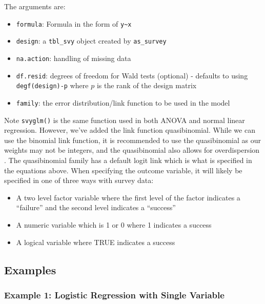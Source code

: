 \documentclass[
]{krantz}
\providecommand{\tightlist}{%
  \setlength{\itemsep}{0pt}\setlength{\parskip}{0pt}}
\begin{document}
The arguments are:

\begin{itemize}
\tightlist
\item
  \texttt{formula}: Formula in the form of \texttt{y\textasciitilde{}x}
\item
  \texttt{design}: a \texttt{tbl\_svy} object created by \texttt{as\_survey}
\item
  \texttt{na.action}: handling of missing data
\item
  \texttt{df.resid}: degrees of freedom for Wald tests (optional) - defaults to using \texttt{degf(design)-p} where \(p\) is the rank of the design matrix
\item
  \texttt{family}: the error distribution/link function to be used in the model
\end{itemize}

Note \texttt{svyglm()} is the same function used in both ANOVA and normal linear regression. However, we've added the link function quasibinomial. While we can use the binomial link function, it is recommended to use the quasibinomial as our weights may not be integers, and the quasibinomial also allows for overdispersion \citep{mccullagh1989binary, lumley2010complex, rcore}. The quasibinomial family has a default logit link which is what is specified in the equations above. When specifying the outcome variable, it will likely be specified in one of three ways with survey data:

\begin{itemize}
\tightlist
\item
  A two level factor variable where the first level of the factor indicates a ``failure'' and the second level indicates a ``success''
\item
  A numeric variable which is 1 or 0 where 1 indicates a success
\item
  A logical variable where TRUE indicates a success
\end{itemize}

\hypertarget{examples-8}{%
\subsection{Examples}\label{examples-8}}

\hypertarget{example-1-logistic-regression-with-single-variable}{%
\subsubsection*{Example 1: Logistic Regression with Single Variable}\label{example-1-logistic-regression-with-single-variable}}
\end{document}
